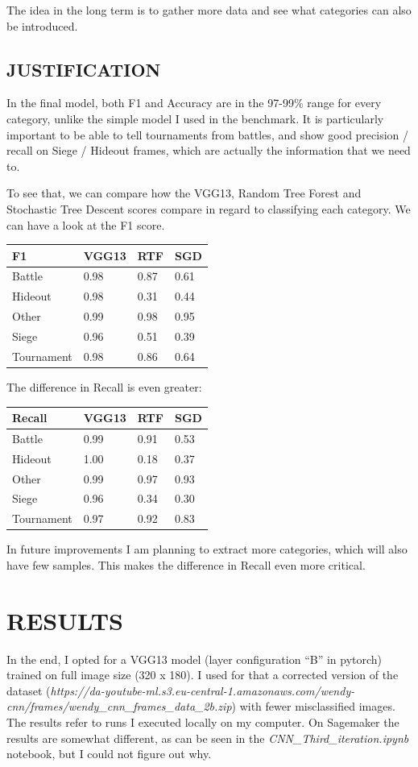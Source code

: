 \documentclass[
]{article}
\begin{document}
The idea in the long term is to gather more data and see what categories
can also be introduced.


\hypertarget{justification}{%
\subsection{JUSTIFICATION}\label{justification}}

In the final model, both F1 and Accuracy are in the 97-99\% range for
every category, unlike the simple model I used in the benchmark. It is
particularly important to be able to tell tournaments from battles, and
show good precision / recall on Siege / Hideout frames, which are
actually the information that we need to.

To see that, we can compare how the VGG13, Random Tree Forest and
Stochastic Tree Descent scores compare in regard to classifying each
category. We can have a look at the F1 score.

\begin{longtable}[]{@{}llll@{}}
\toprule
F1 & VGG13 & RTF & SGD\tabularnewline
\midrule
\endhead
Battle & 0.98 & 0.87 & 0.61\tabularnewline
Hideout & 0.98 & 0.31 & 0.44\tabularnewline
Other & 0.99 & 0.98 & 0.95\tabularnewline
Siege & 0.96 & 0.51 & 0.39\tabularnewline
Tournament & 0.98 & 0.86 & 0.64\tabularnewline
\bottomrule
\end{longtable}

The difference in Recall is even greater:

\begin{longtable}[]{@{}llll@{}}
\toprule
Recall & VGG13 & RTF & SGD\tabularnewline
\midrule
\endhead
Battle & 0.99 & 0.91 & 0.53\tabularnewline
Hideout & 1.00 & 0.18 & 0.37\tabularnewline
Other & 0.99 & 0.97 & 0.93\tabularnewline
Siege & 0.96 & 0.34 & 0.30\tabularnewline
Tournament & 0.97 & 0.92 & 0.83\tabularnewline
\bottomrule
\end{longtable}

In future improvements I am planning to extract more categories, which
will also have few samples. This makes the difference in Recall even
more critical.

\hypertarget{results-1}{%
\section{RESULTS}\label{results-1}}

In the end, I opted for a VGG13 model (layer configuration ``B'' in
pytorch) trained on full image size (320 x 180). I used for that a
corrected version of the dataset
(\emph{https://da-youtube-ml.s3.eu-central-1.amazonaws.com/wendy-cnn/frames/wendy\_cnn\_frames\_data\_2b.zip})
with fewer misclassified images. The results refer to runs I executed
locally on my computer. On Sagemaker the results are somewhat different,
as can be seen in the \emph{CNN\_Third\_iteration.ipynb} notebook, but I
could not figure out why.
\end{document}
